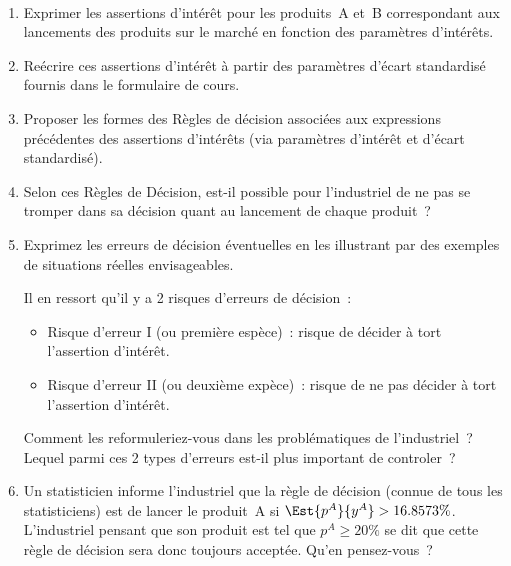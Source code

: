 \documentclass[10pt]{report}
\begin{document}
\begin{exercice} $ $
\begin{enumerate}
\item Exprimer les assertions d'intérêt pour les produits~A et~B correspondant aux lancements des produits sur le marché en fonction des paramètres d'intérêts.
\item Reécrire ces assertions d'intérêt à partir des paramètres d'écart standardisé fournis dans le formulaire de cours.
\item Proposer les formes des Règles de décision associées aux expressions précédentes des assertions d'intérêts (via paramètres d'intérêt et d'écart standardisé).   
\item  Selon ces Règles de Décision, est-il possible pour l'industriel de ne pas se tromper dans sa décision quant au lancement de chaque produit~? 

\item Exprimez les erreurs de décision éventuelles en les illustrant par des exemples de situations réelles envisageables.

Il en ressort qu'il y a 2 risques d'erreurs de décision~: 
\begin{itemize}
\item Risque d'erreur I (ou première espèce)~: risque de décider à tort l'assertion d'intérêt.
\item Risque d'erreur II (ou deuxième expèce)~: risque de ne pas décider à tort l'assertion d'intérêt.
\end{itemize}
Comment les reformuleriez-vous dans les problématiques de l'industriel~? Lequel parmi ces 2 types d'erreurs est-il plus important de controler~?

\item Un statisticien informe l'industriel que la règle de décision (connue de tous les statisticiens) est de lancer le produit~A si $\Est{p^A}{y^A}>16.8573\%$. L'industriel pensant que son produit est tel que $p^A\geq 20\%$ se dit que cette règle de décision sera donc toujours acceptée. Qu'en pensez-vous~? 

\end{enumerate}
\end{exercice}
\end{document}

